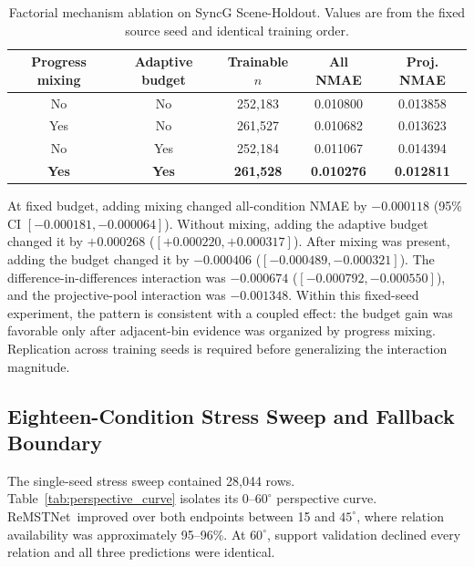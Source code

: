 \documentclass[electronics,article,submit,oneauthor]{Definitions/mdpi}
\newcommand{\modelname}{ReMSTNet}
\begin{document}
\begin{table}[H]
\caption{Factorial mechanism ablation on SyncG Scene-Holdout. Values are from the fixed source seed and identical training order.}
\label{tab:ablation}
\centering
\begin{tabular}{ccccc}
\toprule
\textbf{Progress mixing} & \textbf{Adaptive budget} & \textbf{Trainable $n$} & \textbf{All NMAE} & \textbf{Proj. NMAE} \\
\midrule
No & No & 252,183 & 0.010800 & 0.013858 \\
Yes & No & 261,527 & 0.010682 & 0.013623 \\
No & Yes & 252,184 & 0.011067 & 0.014394 \\
\textbf{Yes} & \textbf{Yes} & \textbf{261,528} & \textbf{0.010276} & \textbf{0.012811} \\
\bottomrule
\end{tabular}
\end{table}

At fixed budget, adding mixing changed all-condition NMAE by $-0.000118$ (95\% CI $[-0.000181,-0.000064]$). Without mixing, adding the adaptive budget changed it by $+0.000268$ ($[+0.000220,+0.000317]$). After mixing was present, adding the budget changed it by $-0.000406$ ($[-0.000489,-0.000321]$). The difference-in-differences interaction was $-0.000674$ ($[-0.000792,-0.000550]$), and the projective-pool interaction was $-0.001348$. Within this fixed-seed experiment, the pattern is consistent with a coupled effect: the budget gain was favorable only after adjacent-bin evidence was organized by progress mixing. Replication across training seeds is required before generalizing the interaction magnitude.

\subsection{Eighteen-Condition Stress Sweep and Fallback Boundary}
\label{subsec:stress_results}

The single-seed stress sweep contained 28,044 rows. Table~\ref{tab:perspective_curve} isolates its 0--$60^{\circ}$ perspective curve. \modelname\ improved over both endpoints between 15 and $45^{\circ}$, where relation availability was approximately 95--96\%. At $60^{\circ}$, support validation declined every relation and all three predictions were identical.
\end{document}
